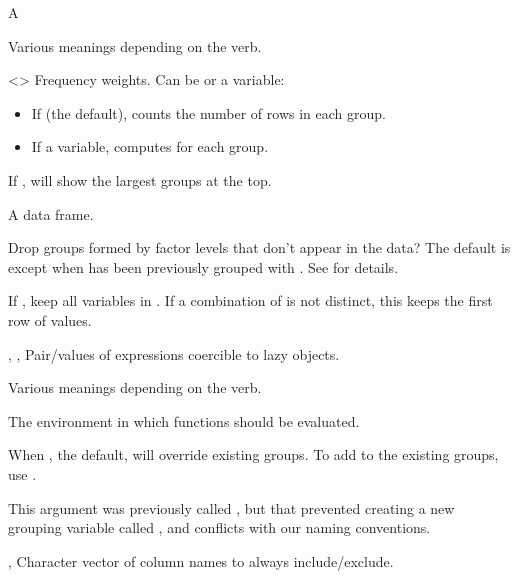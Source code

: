 \documentclass[a4paper]{book}
\begin{document}
\begin{Arguments}
\begin{ldescription}
\item[\code{x}] A 

\item[\code{vars}] Various meanings depending on the verb.

\item[\code{wt}] <> Frequency weights.
Can be  or a variable:
\begin{itemize}

\item{} If  (the default), counts the number of rows in each group.
\item{} If a variable, computes  for each group.

\end{itemize}


\item[\code{sort}] If , will show the largest groups at the top.

\item[\code{.data}] A data frame.

\item[\code{.drop}] Drop groups formed by factor levels that don't appear in the
data? The default is  except when  has been previously
grouped with . See  for details.

\item[\code{.keep\_all}] If , keep all variables in .
If a combination of  is not distinct, this keeps the
first row of values.

\item[\code{dots}, \code{.dots}, \code{...}] Pair/values of expressions coercible to lazy objects.

\item[\code{args}] Various meanings depending on the verb.

\item[\code{env}] The environment in which functions should be evaluated.

\item[\code{add}] When , the default,  will
override existing groups. To add to the existing groups, use
.

This argument was previously called , but that prevented
creating a new grouping variable called , and conflicts with
our naming conventions.

\item[\code{include}, \code{exclude}] Character vector of column names to always
include/exclude.
\end{ldescription}
\end{Arguments}
\end{document}
